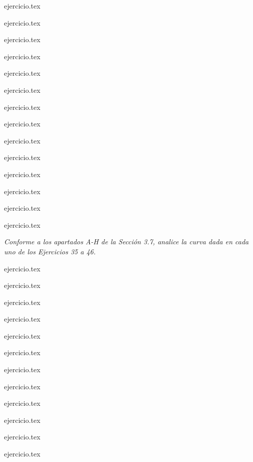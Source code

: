 \begin{enumerate}
    \setcounter{enumi}{20}
    \begin{minipage}{0.45\textwidth}
    {ejercicio.tex}
    \addtocounter{enumi}{1}
    {ejercicio.tex}
    \addtocounter{enumi}{1}
    {ejercicio.tex}
    \addtocounter{enumi}{1}
    {ejercicio.tex}
    \addtocounter{enumi}{1}
    {ejercicio.tex}
    \addtocounter{enumi}{1}
    {ejercicio.tex}
    \addtocounter{enumi}{1}
    {ejercicio.tex}
    \end{minipage}%
    \begin{minipage}{0.45\textwidth}
    \setcounter{enumi}{21}
    {ejercicio.tex}
    \addtocounter{enumi}{1}
    {ejercicio.tex}
    \addtocounter{enumi}{1}
    {ejercicio.tex}
    \addtocounter{enumi}{1}
    {ejercicio.tex}
    \addtocounter{enumi}{1}
    {ejercicio.tex}
    \addtocounter{enumi}{1}
    {ejercicio.tex}
    \addtocounter{enumi}{1}
    {ejercicio.tex}
    \end{minipage}
\end{enumerate}

\vspace{1em}
\noindent \textit{Conforme a los apartados A-H de la Sección 3.7, analice la curva dada en cada uno de los Ejercicios 35 a 46.}

\begin{enumerate}
    \setcounter{enumi}{34}
    \begin{minipage}{0.45\textwidth}
    {ejercicio.tex}
    \addtocounter{enumi}{1}
    {ejercicio.tex}
    \addtocounter{enumi}{1}
    {ejercicio.tex}
    \addtocounter{enumi}{1}
    {ejercicio.tex}
    \addtocounter{enumi}{1}
    {ejercicio.tex}
    \addtocounter{enumi}{1}
    {ejercicio.tex}
    \end{minipage}%
    \begin{minipage}{0.45\textwidth}
    \setcounter{enumi}{35}
    {ejercicio.tex}
    \addtocounter{enumi}{1}
    {ejercicio.tex}
    \addtocounter{enumi}{1}
    {ejercicio.tex}
    \addtocounter{enumi}{1}
    {ejercicio.tex}
    \addtocounter{enumi}{1}
    {ejercicio.tex}
    \addtocounter{enumi}{1}
    {ejercicio.tex}
    \end{minipage}
\end{enumerate}

